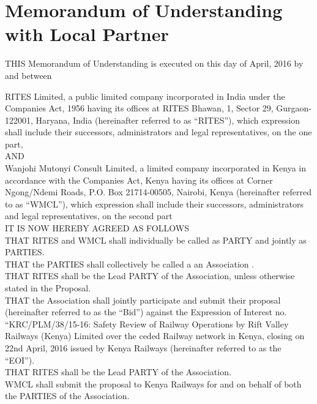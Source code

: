 \section{Memorandum of Understanding with Local Partner}


THIS Memorandum of Understanding is executed on this \hspace{2cm} day of April, 2016 by and between 

RITES Limited, a public limited company incorporated in India under the Companies Act, 1956 having its offices at RITES Bhawan, 1, Sector 29, Gurgaon-122001, Haryana, India (hereinafter referred to as “RITES”), which expression shall include their successors, administrators and legal representatives, on the one part,\\

AND\\

Wanjohi Mutonyi Consult Limited, a limited company incorporated in Kenya in accordance with the Companies Act, Kenya having its offices at Corner Ngong/Ndemi Roads, P.O. Box 21714-00505, Nairobi, Kenya (hereinafter referred to as “WMCL”), which expression shall include their successors, administrators and legal representatives, on the second part\\

IT IS NOW HEREBY AGREED AS FOLLOWS\\

THAT RITES and WMCL shall individually be called as PARTY and jointly as PARTIES.\\

THAT the PARTIES shall collectively be called a an Association .\\

THAT RITES shall be the Lead PARTY of the Association, unless otherwise stated in the Proposal.\\

THAT the Association shall jointly participate and submit their proposal (hereinafter referred to as the “Bid”) against the Expression of Interest no. “KRC/PLM/38/15-16: Safety Review of Railway Operations by Rift Valley Railways (Kenya) Limited over the ceded Railway network in Kenya, closing on 22nd April, 2016 issued by Kenya Railways (hereinafter referred to as the “EOI”).\\

THAT RITES shall be the Lead PARTY of the Association.\\
WMCL  shall submit the proposal to Kenya Railways for and on behalf of both the PARTIES of the Association.\\

